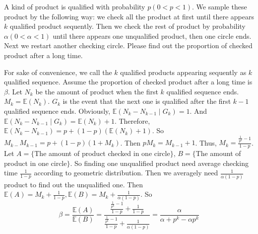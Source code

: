 \documentclass{ctexart}
\begin{document}
\begin{problem}\label{pro:4 }
  A kind of product is qualified with probability \(p(0 < p < 1)\).
  We sample these product by the following way: we check all the product at first until there appears
  \(k\) qualified product sequently. Then we check the rest of product by probability \(\alpha(0 < \alpha <1)\)
  until there appears one unqualified product, then one circle ends. Next we restart another checking
  circle. Please find out the proportion of checked product after a long time.
\end{problem}
\begin{solution}
  For sake of convenience, we call the \(k\) qualified products appearing sequently as \(k\) qualified sequence.
  Assume the proportion of checked product after a long time is \(\beta\).
  Let \(N_k\) be the amount of product when the first \(k\) qualified sequence ends. \(M_k=\mathbb{E}(N_k)\). \(G_k\) is the
  event that the next one is qualified after the first \(k-1\) qualified sequence ends. Obviously, \(\mathbb{E}(N_k-N_{k-1} \mid G_k)=1\).
  And \(\mathbb{E}(N_k-N_{k-1} \mid G_k)=\mathbb{E}(N_k) + 1\).
  Therefore, \(\mathbb{E}(N_k-N_{k-1})=p + (1-p)(\mathbb{E}(N_k) + 1)\). So \(M_{k-} M_{k-1}=p + (1-p)( 1 + M_k)\).
  Then \(pM_k=M_{k-1} + 1\). Thus, \(M_k=\frac{\frac{1}{p^k}-1}{1-p}\).
  Let \(A=\{\)The amount of product checked in one circle\(\}\), \(B=\{\)The amount of product in one circle\(\}\).
  So finding one unqualified product need average checking time \(\frac{1}{1-p}\) according to geometric distribution.
  Then we averagely need \(\frac{1}{\alpha(1-p)}\) product to find out the unqualified one.
  Then \(\mathbb{E}(A)=M_k + \frac{1}{1-p}, \mathbb{E}(B)=M_k + \frac{1}{\alpha(1-p)}\).
  So \[
    \beta = \frac{\mathbb{E}(A)}{\mathbb{E}(B)}=\frac{\frac{\frac{1}{p^k}-1}{1-p} + \frac{1}{1-p}}{\frac{\frac{1}{p^k}-1}{1-p} + \frac{1}{\alpha(1-p)}}=\frac{\alpha}{\alpha + p^k-\alpha p^k}
  \]

\end{solution}
\end{document}
